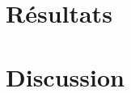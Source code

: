 \documentclass[12pt,a4paper]{report}
\begin{document}
\begin{onehalfspace}
\chapter*{Résultats}

\chapter*{Discussion}


\end{onehalfspace}


\printglossary[type=\acronymtype ,title=Glossaire]

%

\end{document}
